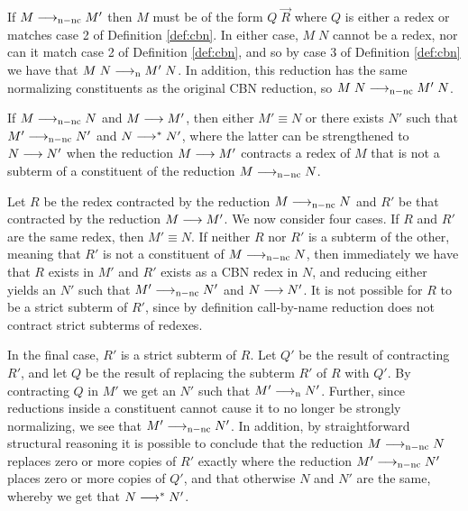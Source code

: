 \documentclass{article}
\begin{document}
\iftechreport
\begin{myproof}
  If $M\longrightarrow_{\mathrm{n-nc}} M'$ then $M$ must be of the form $Q\;\vec{R}$ where
  $Q$ is either a redex or matches case 2 of Definition \ref{def:cbn}.
  In either case, $M\;N$ cannot be a redex, nor can it match case 2 of
  Definition \ref{def:cbn}, and so by case 3 of Definition
  \ref{def:cbn} we have that $M\;N\longrightarrow_{\mathrm{n}} M'\;N$. In addition, this
  reduction has the same normalizing constituents as the original CBN
  reduction, so $M\;N\longrightarrow_{\mathrm{n-nc}} M'\;N$.
\end{myproof}
\fi

\begin{lemma}
  \label{lemma:cbn-diamond}
  If $M\longrightarrow_{\mathrm{n-nc}} N$ and $M\longrightarrow M'$, then either $M'\equiv N$ or
  there exists $N'$ such that $M'\longrightarrow_{\mathrm{n-nc}} N'$ and $N\longrightarrow^{*} N'$,
  where the latter can be strengthened to $N\longrightarrow N'$ when the
  reduction $M\longrightarrow M'$ contracts a redex of $M$ that is not a subterm
  of a constituent of the reduction $M\longrightarrow_{\mathrm{n-nc}} N$.
\end{lemma}

\iftechreport
\begin{myproof}
  Let $R$ be the redex contracted by the reduction $M\longrightarrow_{\mathrm{n-nc}} N$ and
  $R'$ be that contracted by the reduction $M\longrightarrow M'$. We now
  consider four cases. If $R$ and $R'$ are the same redex, then
  $M'\equiv N$. If neither $R$ nor $R'$ is a subterm of the other,
  meaning that $R'$ is not a constituent of $M\longrightarrow_{\mathrm{n-nc}} N$, then
  immediately we have that $R$ exists in $M'$ and $R'$ exists as a CBN
  redex in $N$, and reducing either yields an $N'$ such that
  $M'\longrightarrow_{\mathrm{n-nc}} N'$ and $N\longrightarrow N'$. It is not possible for $R$ to be
  a strict subterm of $R'$, since by definition call-by-name reduction
  does not contract strict subterms of redexes.

  In the final case, $R'$ is a strict subterm of $R$. Let $Q'$ be the
  result of contracting $R'$, and let $Q$ be the result of replacing
  the subterm $R'$ of $R$ with $Q'$. By contracting $Q$ in $M'$ we get
  an $N'$ such that $M'\longrightarrow_{\mathrm{n}} N'$. Further, since reductions inside
  a constituent cannot cause it to no longer be strongly normalizing,
  we see that $M'\longrightarrow_{\mathrm{n-nc}} N'$.  In addition, by straightforward
  structural reasoning it is possible to conclude that the reduction
  $M\longrightarrow_{\mathrm{n-nc}} N$ replaces zero or more copies of $R'$ exactly where
  the reduction $M'\longrightarrow_{\mathrm{n-nc}} N'$ places zero or more copies of $Q'$,
  and that otherwise $N$ and $N'$ are the same, whereby we get that
  $N\longrightarrow^{*} N'$.
\end{myproof}
\fi
\end{document}
